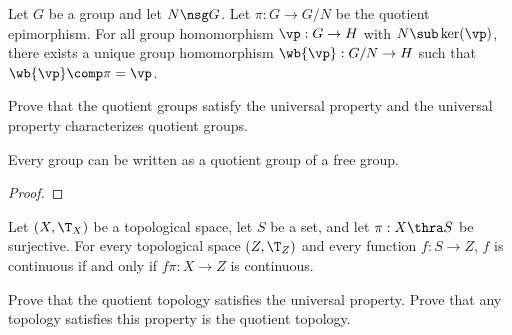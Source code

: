 \documentclass[10pt]{article}
\begin{document}
\begin{Universal property for quotient groups}
    Let $G$ be a group and let $N\nsg G$. Let $\pi:G\to G/N$ be the quotient epimorphism. For all group homomorphism $\vp:G\to H$ with $N\sub\ker(\vp)$, there exists a unique group homomorphism $\wb{\vp}:G/N\to H$ such that $\wb{\vp}\comp\pi=\vp$.
\end{Universal property for quotient groups}
\begin{center}
\end{center}
\begin{problem}
    Prove that the quotient groups satisfy the universal property and the universal property characterizes quotient groups.
\end{problem}
\begin{proposition}
    Every group can be written as a quotient group of a free group.
\end{proposition}
\begin{proof}
    
\end{proof}




\begin{Universal property for quotient topology}
    Let $(X,{\T}_{X})$ be a topological space, let $S$ be a set, and let $\pi:X\thra S$ be surjective. For every topological space $(Z,{\T}_{Z})$ and every function $f:S\to Z$, $f$ is continuous if and only if $f\pi:X\to Z$ is continuous.
\end{Universal property for quotient topology}
\begin{center}
\end{center}
\begin{problem}
    Prove that the quotient topology satisfies the universal property. Prove that any topology satisfies this property is the quotient topology.
\end{problem}
\end{document}

